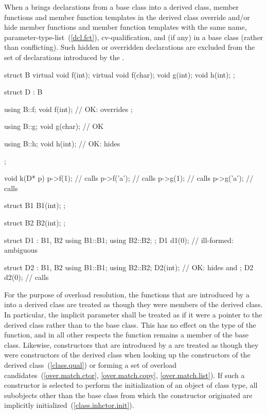 \pnum
{}%
When a  brings declarations from a base class into
a derived class, member functions and member function templates in
the derived class override and/or hide member functions and member
function templates with the same name,
parameter-type-list~(\ref{dcl.fct}), cv-qualification, and  (if any) in a base
class (rather than conflicting).
Such hidden or overridden declarations are excluded from the set of
declarations introduced by the .
\enterexample

\begin{codeblock}
struct B {
  virtual void f(int);
  virtual void f(char);
  void g(int);
  void h(int);
};

struct D : B {
  using B::f;
  void f(int);      // OK:  overrides ;

  using B::g;
  void g(char);     // OK

  using B::h;
  void h(int);      // OK:  hides 
};

void k(D* p)
{
  p->f(1);          // calls 
  p->f('a');        // calls 
  p->g(1);          // calls 
  p->g('a');        // calls 
}

struct B1 {
  B1(int);
};

struct B2 {
  B2(int);
};

struct D1 : B1, B2 {
  using B1::B1;
  using B2::B2;
};
D1 d1(0);    // ill-formed: ambiguous

struct D2 : B1, B2 {
  using B1::B1;
  using B2::B2;
  D2(int);   // OK:  hides  and 
};
D2 d2(0);    // calls 
\end{codeblock}
\exitexample

\pnum
{}%
For the purpose of overload resolution, the functions that are
introduced by a  into a derived class
are treated as though they were members of the derived class. In
particular, the implicit  parameter shall be treated as if
it were a pointer to the derived class rather than to the base class.
This has no effect on the type of the function, and in all other
respects the function remains a member of the base class.
Likewise, constructors that are introduced by a 
are treated as though they were constructors of the derived class
when looking up the constructors of the derived class~(\ref{class.qual})
or forming a set of overload candidates~(\ref{over.match.ctor}, \ref{over.match.copy}, \ref{over.match.list}).
If such a constructor is selected to perform the initialization
of an object of class type, all subobjects other than the base class
from which the constructor originated
are implicitly initialized~(\ref{class.inhctor.init}).


